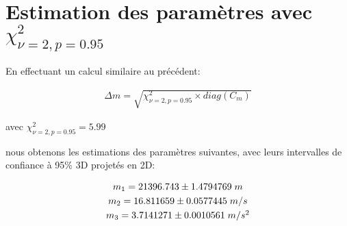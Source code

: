 \documentclass[12pt,a4paper]{extreport}
\begin{document}
\section{Estimation des paramètres avec $\chi_{\nu=2,p=0.95}^2$}
En effectuant un calcul similaire au précédent:

\begin{gather}
	\Delta m = \sqrt{\chi_{\nu=2,p=0.95}^2 \times diag(C_m)}
\end{gather}

avec $\chi_{\nu=2,p=0.95}^2 = 5.99$


nous obtenons les estimations des paramètres suivantes, avec leurs intervalles de confiance à 95\% 3D projetés en 2D:

\begin{equation}
	\begin{array}{c}
		m_1 = 21396.743 \pm 1.4794769\;m\\
		[\jot] m_2 = 16.811659 \pm 0.0577445\;m/s\\
		[\jot] m_3 = 3.7141271 \pm 0.0010561\;m/s^2
	\end{array}
\end{equation}
\end{document}

